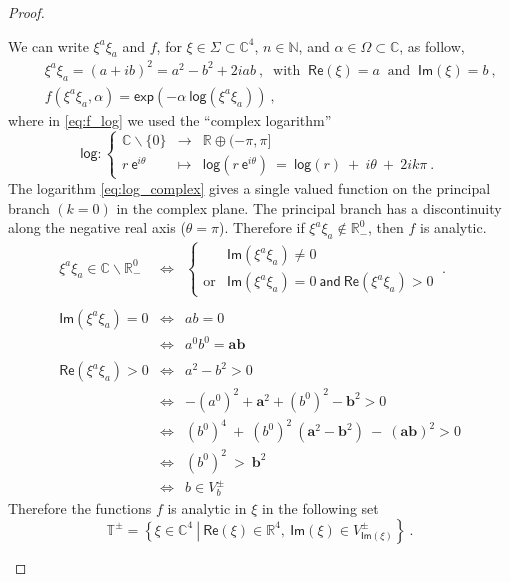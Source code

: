 \documentclass[11pt]{book}
\renewcommand{\Re}{\mathsf{Re}}
\renewcommand{\Im}{\mathsf{Im}}
\renewcommand{\exp}{\mathsf{exp}}
\renewcommand{\log}{\mathsf{log}}
\newcommand{\Cbb}{\mathbb{C}}
\newcommand{\Nbb}{\mathbb{N}}
\theoremstyle{break}
\begin{document}
\begin{proof}
\begin{description}
We can write $\xi^{a}\xi_{a}$ and $f$, for $\xi \in \Sigma \subset \Cbb^4$, $n \in \Nbb$, and $\alpha \in \Omega \subset \Cbb$, as follow,
%
\begin{eqnarray}
&& \xi^{a}\xi_{a} = (a+ib)^2 = a^2 - b^2 + 2iab \ , \ \mbox{ with } \ \Re(\xi)=a \ \mbox{ and } \ \Im(\xi)=b \ , \nonumber \\[2pt]
%
&& f(\xi^a\xi_{a},\alpha) = \exp\left(-\alpha \ \log(\xi^{a}\xi_{a}) \right) \ ,
\label{eq:f_log}
\end{eqnarray}
%
where in \eqref{eq:f_log} we used the ``complex logarithm'' 
%
\begin{equation}
\mathsf{log}: \left\{
\begin{array}{rcl}
\mathbb{C} \backslash \{0\}  & \to & \mathbb{R} \oplus (-\pi,\pi] \\
r \ \mathsf{e}^{i\theta} & \mapsto & \mathsf{log}(r \ \mathsf{e}^{i\theta}) \ = \ \mathsf{log}(r) \ + \ i\theta \ + \ 2 i k \pi \ .
\end{array}\right.
\label{eq:log_complex}
\end{equation}
%
The logarithm \eqref{eq:log_complex} gives a single valued function on the principal branch $(k=0)$ in the complex plane. The principal branch has a discontinuity along the negative real axis ($\theta=\pi$). Therefore if $\xi^{a}\xi_{a} \notin \mathbb{R}^0_{-}$, then $f$ is analytic.
%
\begin{eqnarray*}
\xi^{a}\xi_{a} \in \mathbb{C} \backslash \mathbb{R}_{-}^0 &\Longleftrightarrow&
\left\{
\begin{array}{cll}
& \Im(\xi^{a}\xi_{a}) \neq 0 \\
\text{or} & \Im(\xi^{a}\xi_{a}) = 0 \ \mathsf{and} \ \Re(\xi^{a}\xi_{a}) > 0  
\end{array}
\right. \ . \\
&& \\
\Im(\xi^{a}\xi_{a}) = 0 &\Longleftrightarrow& ab=0 \\
&\Longleftrightarrow& a^0 b^0 = \mathbf{ab} \\
&& \\
\Re(\xi^{a}\xi_{a}) > 0 &\Longleftrightarrow& a^2 - b^2 > 0 \\
&\Longleftrightarrow& -(a^0)^2 + \mathbf{a}^2 + (b^0)^2 - \mathbf{b}^2 > 0 \nonumber \\
&\Longleftrightarrow& (b^0)^4 \ + \ (b^0)^2 \ (\mathbf{a}^2-\mathbf{b}^2) \ - \ \left(\mathbf{a}\mathbf{b}\right)^2 > 0 \nonumber \\
&\Longleftrightarrow& (b^0)^2 \ > \ \mathbf{b}^2 \nonumber \\
&\Longleftrightarrow& b \in V^{\pm}_b
\end{eqnarray*}
%
Therefore the functions $f$ is analytic in $\xi$ in the following set
%
\begin{equation}
\mathbb{T}^\pm = \left. \left\{ \xi \in \mathbb{C}^4 \ \right| \ \Re(\xi)\in\mathbb{R}^4 , \ \Im(\xi)\in V^\pm_{\Im(\xi)} \right\} \ .
\label{eq:cone_analytic}
\end{equation}



\end{description}
\end{proof}
\end{document}
